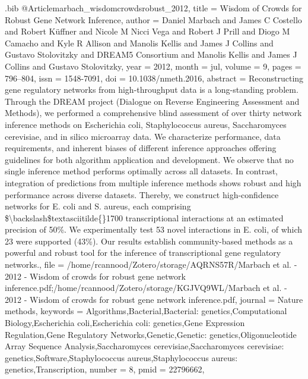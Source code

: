 \documentclass[
  table,
  10pt,
  a4paper]{article}
\begin{document}
\begin{filecontents}{\jobname.bib}
@Article{marbach_wisdomcrowdsrobust_2012,
	title = {Wisdom of {{Crowds}} for {{Robust Gene Network Inference}}},
	author = {Daniel Marbach and James C Costello and Robert K{\"u}ffner and Nicole M Nicci Vega and Robert J Prill and Diogo M Camacho and Kyle R Allison and Manolis Kellis and James J Collins and Gustavo Stolovitzky and {DREAM5 Consortium} and Manolis Kellis and James J Collins and Gustavo Stolovitzky},
	year = {2012},
	month = {jul},
	volume = {9},
	pages = {796--804},
	issn = {1548-7091},
	doi = {10.1038/nmeth.2016},
	abstract = {Reconstructing gene regulatory networks from high-throughput data is a long-standing problem. Through the DREAM project (Dialogue on Reverse Engineering Assessment and Methods), we performed a comprehensive blind assessment of over thirty network inference methods on Escherichia coli, Staphylococcus aureus, Saccharomyces cerevisiae, and in silico microarray data. We characterize performance, data requirements, and inherent biases of different inference approaches offering guidelines for both algorithm application and development. We observe that no single inference method performs optimally across all datasets. In contrast, integration of predictions from multiple inference methods shows robust and high performance across diverse datasets. Thereby, we construct high-confidence networks for E. coli and S. aureus, each comprising \$\textbackslash backslash\$textasciitilde\{\}1700 transcriptional interactions at an estimated precision of 50\%. We experimentally test 53 novel interactions in E. coli, of which 23 were supported (43\%). Our results establish community-based methods as a powerful and robust tool for the inference of transcriptional gene regulatory networks.},
	file = {/home/rcannood/Zotero/storage/AQRNS57R/Marbach et al. - 2012 - Wisdom of crowds for robust gene network inference.pdf;/home/rcannood/Zotero/storage/KGJVQ9WL/Marbach et al. - 2012 - Wisdom of crowds for robust gene network inference.pdf},
	journal = {Nature methods},
	keywords = {Algorithms,Bacterial,Bacterial: genetics,Computational Biology,Escherichia coli,Escherichia coli: genetics,Gene Expression Regulation,Gene Regulatory Networks,Genetic,Genetic: genetics,Oligonucleotide Array Sequence Analysis,Saccharomyces cerevisiae,Saccharomyces cerevisiae: genetics,Software,Staphylococcus aureus,Staphylococcus aureus: genetics,Transcription},
	number = {8},
	pmid = {22796662},
}


\end{filecontents}
\end{document}
